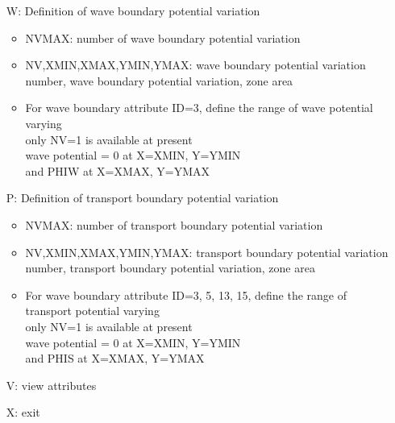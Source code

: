 \begin{enumerate}
\begin{itemize}
\item[W:]
Definition of wave boundary potential variation
\begin{itemize}
\item
NVMAX: number of wave boundary potential variation
\item
NV,XMIN,XMAX,YMIN,YMAX: wave boundary potential variation number, wave
boundary potential variation, zone area
\item
For wave boundary attribute ID=3, define the range of
wave potential varying
\\\qquad only NV=1 is available at present
\\\qquad wave potential = 0 at X=XMIN, Y=YMIN
\\\qquad and PHIW at X=XMAX, Y=YMAX
\end{itemize}

\item[P:]
Definition of transport boundary potential variation
\begin{itemize}
\item
NVMAX: number of transport boundary potential variation
\item
NV,XMIN,XMAX,YMIN,YMAX: transport boundary potential variation number,
transport boundary potential variation, zone area
\item
For wave boundary attribute ID=3, 5, 13, 15, define the range of
transport potential varying
\\\qquad only NV=1 is available at present
\\\qquad wave potential = 0 at X=XMIN, Y=YMIN
\\\qquad and PHIS at X=XMAX, Y=YMAX
\end{itemize}

\item[V:]
view attributes
\item[X:]
exit
\end{itemize}
\end{enumerate}

